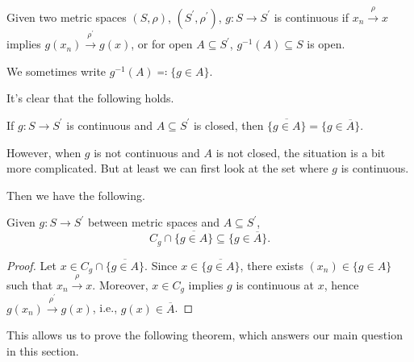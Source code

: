 \begin{prev}
	Given two metric spaces \((S, \rho )\), \((S^{\prime} , \rho ^{\prime} )\), \(g\colon S \to S^{\prime} \) is continuous if \(x_n \overset{\rho }{\to } x\) implies \(g(x_n) \overset{\rho ^{\prime} }{\to } g(x)\), or for open \(A \subseteq S^{\prime} \), \(g^{-1} (A) \subseteq S\) is open.
\end{prev}

\begin{notation}
	We sometimes write \(g ^{-1} (A) \eqqcolon \{ g \in A \} \).
\end{notation}

It's clear that the following holds.

\begin{note}
	If \(g \colon S \to S^{\prime} \) is continuous and \(A \subseteq S^{\prime} \) is closed, then \(\overline{\{ g \in A \} } = \{ g \in \overline{A} \}\).
\end{note}

However, when \(g\) is not continuous and \(A\) is not closed, the situation is a bit more complicated. But at least we can first look at the set where \(g\) is continuous.


Then we have the following.

\begin{proposition}\label{prop:pre-image-closure}
	Given \(g\colon S \to S^{\prime} \) between metric spaces and \(A \subseteq S^{\prime} \),
	\[
		C_g \cap \overline{\{ g\in A \} }
		\subseteq \{ g \in \overline{A}  \}.
	\]
\end{proposition}
\begin{proof}
	Let \(x \in C_g \cap \overline{\{ g\in A \} }\). Since \(x\in \overline{\{ g\in A \} }\), there exists \((x_n) \in \{ g\in A \} \) such that \(x_n \overset{\rho }{\to } x\). Moreover, \(x\in C_g\) implies \(g\) is continuous at \(x\), hence \(g(x_n) \overset{\rho ^{\prime} }{\to } g(x)\), i.e., \(g(x) \in \overline{A} \).
\end{proof}

This allows us to prove the following theorem, which answers our main question in this section.

